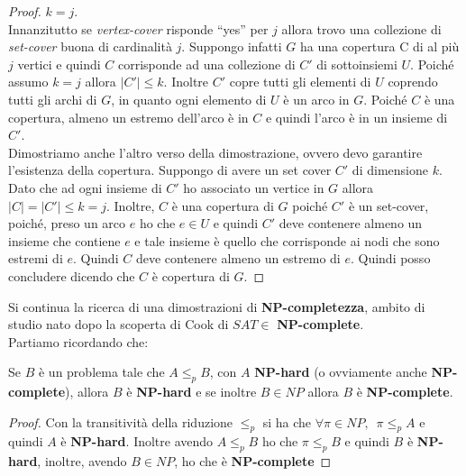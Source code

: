 \begin{proof}
											$k=j$.\\
											Innanzitutto se \textit{vertex-cover} risponde ``yes'' per $j$ allora trovo
											una collezione di \textit{set-cover} buona di cardinalità $j$. Suppongo
											infatti $G$ ha una copertura C di al più $j$ vertici e quindi $C$ corrisponde
											ad una collezione di $C'$ di sottoinsiemi $U$. Poiché assumo $k=j$ allora
											$|C'|\leq k$. Inoltre $C'$ copre tutti gli elementi di $U$ coprendo tutti gli
											archi di $G$, in quanto ogni elemento di $U$ è un arco in $G$. Poiché $C$ è
											una copertura, almeno un estremo dell’arco è in $C$  e quindi l’arco è in un
											insieme di $C'$.\\
											Dimostriamo anche l'altro verso della dimostrazione, ovvero devo garantire
											l'esistenza della copertura. Suppongo di avere un set cover $C'$ di dimensione
											$k$. Dato che ad ogni insieme di $C'$ ho associato un vertice in $G$ allora
											$|C|=|C'|\leq k=j$. Inoltre, $C$ è una copertura di $G$ poiché $C'$ è un
											set-cover, poiché, preso un arco $e$ ho che $e\in U$ e quindi $C'$ deve
											contenere almeno un insieme che contiene $e$ e tale insieme è quello che
											corrisponde ai nodi che sono estremi di $e$. Quindi $C$ deve contenere almeno
											un estremo di $e$. Quindi posso concludere dicendo che $C$ è copertura di $G$.
										\end{proof}
										Si continua la ricerca di una dimostrazioni di \textbf{NP-completezza}, ambito
										di studio nato dopo la scoperta di Cook di $SAT\in$ \textbf{NP-complete}.\\
										Partiamo ricordando che:
										\begin{definizione}
											Se $B$ è un problema tale che $A\leq_p B$, con $A$
											\textbf{NP-hard} (o ovviamente anche \textbf{NP-complete}), allora $B$ è
											\textbf{NP-hard} e se inoltre $B\in NP$ allora $B$ è \textbf{NP-complete}.  
										\end{definizione}
										\begin{proof}
											Con la transitività della riduzione $\leq_p$ si ha che $\forall\pi\in
											NP,\,\,\, \pi\leq_p A$ e quindi $A$ è \textbf{NP-hard}. Inoltre avendo
											$A\leq_p B$ ho che  $\pi\leq_p B$ e quindi $B$ è \textbf{NP-hard}, inoltre,
											avendo $B\in NP$, ho che è \textbf{NP-complete}
										\end{proof}
																				
